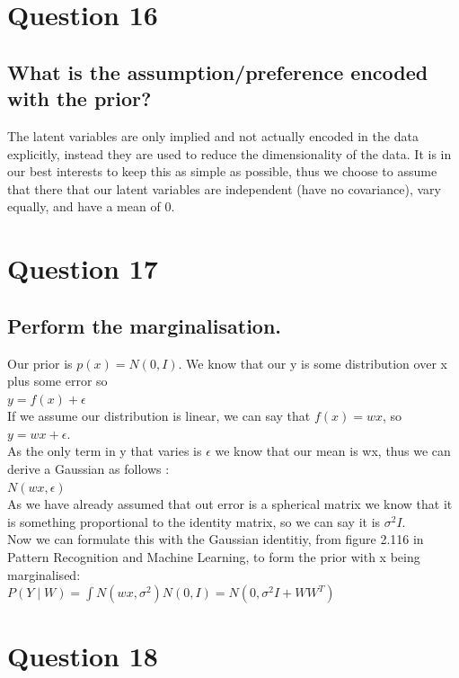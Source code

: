 \documentclass[a4paper, 9pt]{article}
\begin{document}
\section*{Question 16}
\subsection*{What is the assumption/preference encoded with the prior?}
The latent variables are only implied and not actually encoded in the data explicitly, instead they are used to reduce the dimensionality of the data. It is in our best interests to keep this as simple as possible, thus we choose to assume that there that our latent variables are independent (have no covariance), vary equally, and have a mean of 0.

\section*{Question 17}
\subsection*{Perform the marginalisation.}
Our prior is \( p(x) = N (0, I) \). We know that our y is some distribution over x plus some error so \\

 \( y = f(x) + \epsilon \) \\
 
 If we assume our distribution is linear, we can say that \( f(x) = wx \), so \( y = wx + \epsilon \). \\
As the only term in y that varies is \( \epsilon \) we know that our mean is wx, thus we can derive a Gaussian as follows : \\

\( N (wx, \epsilon) \) \\

As we have already assumed that out error is a spherical matrix we know that it is something proportional to the identity matrix, so we can say it is \( \sigma^2 I \). \\
Now we can formulate this with the Gaussian identitiy, from figure 2.116 in Pattern Recognition and Machine Learning, to form the prior with x being marginalised: \\

\( P(Y \mid W) = \int N(wx, \sigma^2) N(0, I) = N(0, \sigma^2 I + WW^T) \) 

\section*{Question 18}
\end{document}
